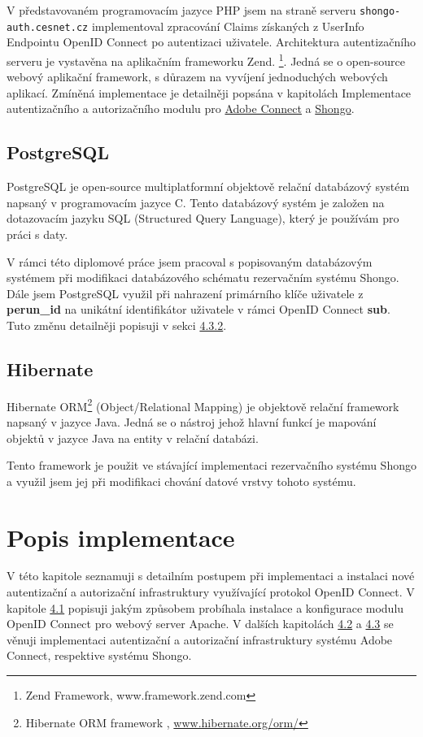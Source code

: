\documentclass[
  printed, %
  twoside, %
  table,   %
  nolof,     %
  nolot,     %
]{fithesis3}
\begin{document}
V představovaném programovacím jazyce PHP jsem na straně serveru \texttt{shongo-auth.cesnet.cz} implementoval zpracování Claims získaných z UserInfo Endpointu OpenID Connect po autentizaci uživatele. Architektura autentizačního serveru je vystavěna na aplikačním frameworku Zend. \footnote{Zend Framework, www.framework.zend.com}. Jedná se o open-source webový aplikační framework, s důrazem na vyvíjení jednoduchých webových aplikací. Zmíněná implementace je detailněji popsána v kapitolách Implementace autentizačního a autorizačního modulu pro \hyperref[ACImpl]{Adobe Connect} a \hyperref[ShongoImpl]{Shongo}. \par

\section{PostgreSQL}
PostgreSQL \cite{postgresql} je open-source multiplatformní objektově relační databázový systém napsaný v programovacím jazyce C. Tento databázový systém je založen na dotazovacím jazyku SQL (Structured Query Language), který je používám pro práci s daty. 
\par

V rámci této diplomové práce jsem pracoval s popisovaným databázovým systémem při modifikaci databázového schématu rezervačním systému Shongo. Dále jsem PostgreSQL využil při nahrazení primárního klíče uživatele z \textbf{perun\_id} na unikátní identifikátor uživatele v rámci OpenID Connect \textbf{sub}. Tuto změnu detailněji popisuji v sekci \hyperref[ShongoImpl-web]{4.3.2}. 

\section{Hibernate}
Hibernate ORM\footnote{Hibernate ORM framework , \url{www.hibernate.org/orm/}} (Object/Relational Mapping) je objektově relační framework napsaný v jazyce Java. Jedná se o nástroj jehož hlavní funkcí je mapování objektů v jazyce Java na entity v relační databázi.
\par
Tento framework je použit ve stávající implementaci rezervačního systému Shongo a využil jsem jej při modifikaci chování datové vrstvy tohoto systému.  


\chapter{Popis implementace}
V této kapitole seznamuji s detailním postupem při implementaci a instalaci nové autentizační a autorizační infrastruktury využívající protokol OpenID Connect. V kapitole \hyperref[apacheConfig]{4.1} popisuji jakým způsobem probíhala instalace a konfigurace modulu OpenID Connect pro webový server Apache. V dalších kapitolách \hyperref[ACImpl]{4.2} a \hyperref[ShongoImpl]{4.3} se věnuji implementaci autentizační a autorizační infrastruktury systému Adobe Connect, respektive systému Shongo.   
\end{document}
